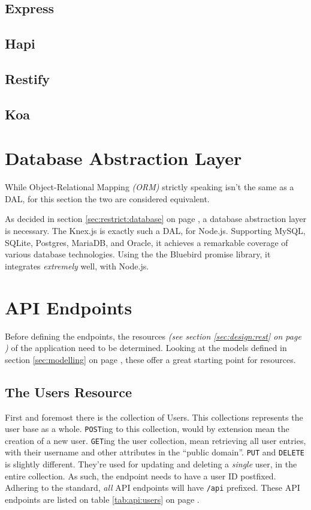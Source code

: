 		\subsection{Express}
		\subsection{Hapi}
		\subsection{Restify}
		\subsection{Koa}


	\section{Database Abstraction Layer}
		While Object-Relational Mapping \emph{(ORM)} strictly speaking isn't the same as a DAL, for this section the two are considered equivalent.


		As decided in section \ref{sec:restrict:database} on page \pageref{sec:restrict:database}, a database abstraction layer is necessary. The Knex.js is exactly such a DAL, for Node.js. Supporting MySQL, SQLite, Postgres, MariaDB, and Oracle, it achieves a remarkable coverage of various database technologies. Using the the Bluebird promise library, it integrates \emph{extremely} well, with Node.js.


	\section{API Endpoints}
		Before defining the endpoints, the resources \emph{(see section \ref{sec:design:rest} on page \pageref{sec:design:rest})} of the application need to be determined. Looking at the models defined in section \ref{sec:modelling} on page \pageref{sec:modelling}, these offer a great starting point for resources.


		\subsection{The Users Resource}
			First and foremost there is the collection of Users. This collections represents the user base as a whole. \verb=POST=ing to this collection, would by extension mean the creation of a new user. \verb=GET=ing the user collection, mean retrieving all user entries, with their username and other attributes in the ``public domain''. \verb=PUT= and \verb=DELETE= is slightly different. They're used for updating and deleting a \emph{single} user, in the entire collection. As such, the endpoint needs to have a user ID postfixed. Adhering to the standard, \emph{all} API endpoints will have \verb=/api= prefixed. These API endpoints are listed on table \ref{tab:api:users} on page \pageref{tab:api:users}.

